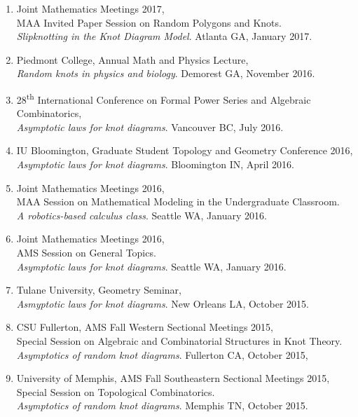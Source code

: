 \documentclass[letterpaper]{article}
\begin{document}
\begin{enumerate}
\item Joint Mathematics Meetings 2017, \\
  MAA Invited Paper Session on Random Polygons and Knots. \\
  \textit{Slipknotting in the Knot Diagram Model}. Atlanta GA, January 2017.

\item Piedmont College, Annual Math and Physics Lecture, \\
  \textit{Random knots in physics and biology}. Demorest GA, November 2016.

\item 28\textsuperscript{th} International Conference on Formal Power Series and
  Algebraic Combinatorics, \\
  \textit{Asymptotic laws for knot diagrams}. Vancouver BC, July 2016.

\item IU Bloomington, Graduate Student Topology and Geometry Conference 2016, \\
  \textit{Asymptotic laws for knot diagrams}. Bloomington IN, April 2016.
  
\item Joint Mathematics Meetings 2016, \\
  MAA Session on Mathematical Modeling in the Undergraduate Classroom. \\
  \textit{A robotics-based calculus class}. Seattle WA, January 2016.

\item Joint Mathematics Meetings 2016, \\
  AMS Session on General Topics. \\
  \textit{Asymptotic laws for knot diagrams}. Seattle WA, January 2016.

\item Tulane University, Geometry Seminar, \\
  \textit{Asmyptotic laws for knot diagrams}. New Orleans LA, October 2015.

\item CSU Fullerton, AMS Fall Western Sectional Meetings 2015,\\
  Special Session on Algebraic and Combinatorial Structures in Knot Theory. \\
  \textit{Asymptotics of random knot diagrams}. Fullerton CA, October 2015,

\item University of Memphis, AMS Fall Southeastern Sectional Meetings 2015,\\
  Special Session on Topological Combinatorics. \\
  \textit{Asymptotics of random knot diagrams}. Memphis TN, October 2015.


\end{enumerate}
\end{document}
